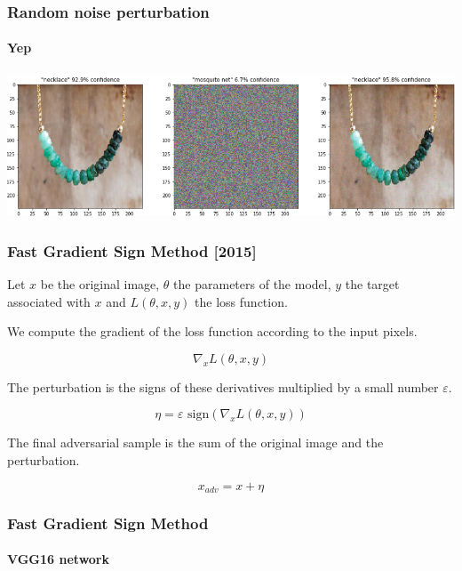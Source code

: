 \documentclass[9pt]{beamer}
\begin{document}
\begin{frame}
  \frametitle{Random noise perturbation}

  \framesubtitle{Yep}

  \begin{center}
    \includegraphics[width = \linewidth]{images/random_perturbation.png}
  \end{center}

\end{frame}

\begin{frame}
  \frametitle{Fast Gradient Sign Method [2015]}

  Let $x$ be the original image, $\theta$ the parameters of the model,
  $y$ the target associated with $x$ and $L(\theta, x, y)$ the loss
  function.

  \bigskip

  We compute the gradient of the loss function according to the input
  pixels.

  \[
  \nabla_{x} L(\theta, x, y)
  \]

  \bigskip

  The perturbation is the signs of these derivatives multiplied by a
  small number $\varepsilon$.

  \[
  \eta = \varepsilon \text{ sign}(\nabla_{x} L(\theta, x, y))
  \]

  \bigskip

  The final adversarial sample is the sum of the original image and
  the perturbation.

  \[
  x_{adv} = x + \eta
  \]

\end{frame}

\begin{frame}
  \frametitle{Fast Gradient Sign Method}

  \framesubtitle{\textbf{VGG16} network}

  \begin{center}
    
  \end{center}
\end{frame}
\end{document}
